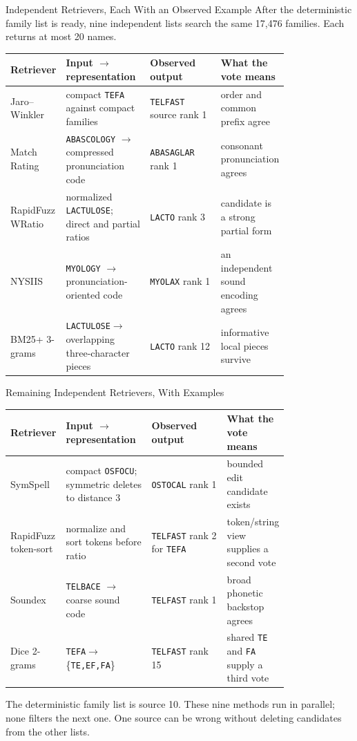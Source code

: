 \documentclass[aspectratio=169,10pt]{beamer}
\newcommand{\code}[1]{\texttt{#1}}
\begin{document}
\begin{frame}{Independent Retrievers, Each With an Observed Example}
\scriptsize
After the deterministic family list is ready, nine independent lists search the
same 17,476 families. Each returns at most 20 names.

\begin{tabularx}{\linewidth}{@{}L{0.20\linewidth}L{0.31\linewidth}L{0.29\linewidth}Y@{}}
\toprule
\textbf{Retriever} & \textbf{Input $\rightarrow$ representation} & \textbf{Observed output} & \textbf{What the vote means} \\
\midrule
Jaro--Winkler & compact \code{TEFA} against compact families & \code{TELFAST} source rank 1 & order and common prefix agree \\
Match Rating & \code{ABASCOLOGY} $\rightarrow$ compressed pronunciation code & \code{ABASAGLAR} rank 1 & consonant pronunciation agrees \\
RapidFuzz WRatio & normalized \code{LACTULOSE}; direct and partial ratios & \code{LACTO} rank 3 & candidate is a strong partial form \\
NYSIIS & \code{MYOLOGY} $\rightarrow$ pronunciation-oriented code & \code{MYOLAX} rank 1 & an independent sound encoding agrees \\
BM25+ 3-grams & \code{LACTULOSE}$\rightarrow$ overlapping three-character pieces & \code{LACTO} rank 12 & informative local pieces survive \\
\bottomrule
\end{tabularx}
\end{frame}

\begin{frame}{Remaining Independent Retrievers, With Examples}
\scriptsize
\begin{tabularx}{\linewidth}{@{}L{0.20\linewidth}L{0.31\linewidth}L{0.29\linewidth}Y@{}}
\toprule
\textbf{Retriever} & \textbf{Input $\rightarrow$ representation} & \textbf{Observed output} & \textbf{What the vote means} \\
\midrule
SymSpell & compact \code{OSFOCU}; symmetric deletes to distance 3 & \code{OSTOCAL} rank 1 & bounded edit candidate exists \\
RapidFuzz token-sort & normalize and sort tokens before ratio & \code{TELFAST} rank 2 for \code{TEFA} & token/string view supplies a second vote \\
Soundex & \code{TELBACE} $\rightarrow$ coarse sound code & \code{TELFAST} rank 1 & broad phonetic backstop agrees \\
Dice 2-grams & \code{TEFA}$\rightarrow$\{\code{TE,EF,FA}\} & \code{TELFAST} rank 15 & shared \code{TE} and \code{FA} supply a third vote \\
\bottomrule
\end{tabularx}

\vspace{3mm}
The deterministic family list is source 10. These nine methods run in parallel;
none filters the next one. One source can be wrong without deleting candidates
from the other lists.
\end{frame}
\end{document}
